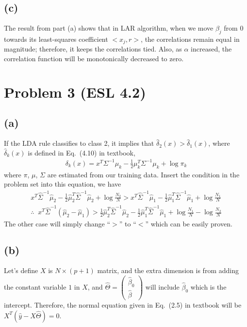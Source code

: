 \documentclass[pra,groupedaddress,amsmath,amssymb, column]{revtex4}
\begin{document}
\subsection*{(c)}
The result from part (a) shows that in LAR algorithm, when we move $\beta_j$ from $0$ towards its least-squares coefficient $<x_j, r>$, the correlations remain equal in magnitude; therefore, it keeps the correlations tied. Also, as $\alpha$ increased, the correlation function will be monotonically decreased to zero.




\section*{Problem 3 (ESL 4.2)}
\subsection*{(a)}
If the LDA rule classifies to class 2, it implies that $\hat{\delta}_2(x) >\hat{\delta}_1(x)$, where $\hat{\delta}_k(x)$ is defined in Eq.~(4.10) in textbook,
\begin{align}
	\delta_k(x) = x^T\Sigma^{-1}\mu_k - \frac{1}{2}\mu_k^T\Sigma^{-1}\mu_k + \log\pi_k
\end{align}
where $\pi$, $\mu$, $\Sigma$ are estimated from our training data. Insert the condition in the problem set into this equation, we have
\begin{align}
x^T\hat{\Sigma}^{-1}\hat{\mu}_2 - \frac{1}{2}\hat{\mu}_2^T\hat{\Sigma}^{-1}\hat{\mu}_2 + \log \frac{N_2}{N} > 
x^T\hat{\Sigma}^{-1}\hat{\mu}_1 - \frac{1}{2}\hat{\mu}_1^T\hat{\Sigma}^{-1}\hat{\mu}_1 + \log\frac{N_1}{N}\\
\therefore\;\;x^T\hat{\Sigma}^{-1}(\hat{\mu}_2-\hat{\mu}_1)>\frac{1}{2}\hat{\mu}_2^T\hat{\Sigma}^{-1}\hat{\mu}_2-\frac{1}{2}\hat{\mu}_1^T\hat{\Sigma}^{-1}\hat{\mu}_1+ \log\frac{N_1}{N} - \log\frac{N_2}{N}
\end{align}
The other case will simply change ``$>$'' to ``$<$'' which can be easily proven.

\subsection*{(b)}
Let's define $X$ is $N\times(p+1)$ matrix, and the extra dimension is from adding the constant variable $1$ in $X$, and $\hat{\Theta}=\left( \begin{array}{c}
\hat{\beta}_0 \\ \hat{\beta} \end{array} \right)$ will include $\hat{\beta}_0$ which is the intercept. Therefore, the normal equation given in Eq.~(2.5) in textbook will be $X^T(\hat{y}-X\hat{\Theta})=0$.
\end{document}
